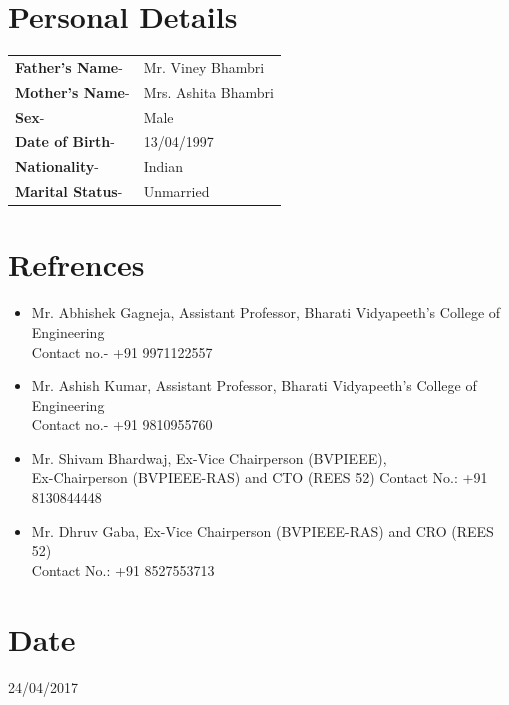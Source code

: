 \documentclass[11pt]{article}
\begin{document}
\begin{minipage}{1.5\linewidth}
\section{\color{yellow}Per\color{black}sonal Details}
\begin{tabular}{l l}
\textbf{Father's Name}-& Mr. Viney Bhambri\\ 
\textbf{Mother's Name}-& Mrs. Ashita Bhambri\\
\textbf{Sex}-& Male\\
\textbf{Date of Birth}-& 13/04/1997\\
\textbf{Nationality}-& Indian\\
\textbf{Marital Status}-& Unmarried\\
\end{tabular}
\section{\color{magenta}Ref\color{black}rences}
\begin{itemize}
\item Mr. Abhishek Gagneja, Assistant Professor, Bharati Vidyapeeth's College of Engineering\\
Contact no.- +91 9971122557
\item Mr. Ashish Kumar, Assistant Professor, Bharati Vidyapeeth's College of Engineering\\
Contact no.- +91 9810955760
\item Mr. Shivam Bhardwaj, Ex-Vice Chairperson (BVPIEEE),\\Ex-Chairperson (BVPIEEE-RAS) and CTO (REES 52)
Contact No.: +91 8130844448
\item Mr. Dhruv Gaba, Ex-Vice Chairperson (BVPIEEE-RAS) and CRO (REES 52)\\
Contact No.: +91 8527553713

\end{itemize}

\section{\color{green}Dat\color{black}e}
24/04/2017

\end{minipage}
\end{document}
